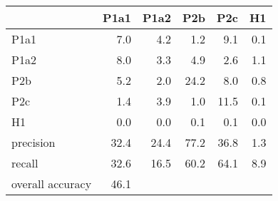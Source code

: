 \begin{tabular}{lrrrrr}
\toprule
{} &  P1a1 &  P1a2 &  P2b &  P2c &  H1 \\
\midrule
P1a1             &   7.0 &   4.2 &  1.2 &  9.1 & 0.1 \\
P1a2             &   8.0 &   3.3 &  4.9 &  2.6 & 1.1 \\
P2b              &   5.2 &   2.0 & 24.2 &  8.0 & 0.8 \\
P2c              &   1.4 &   3.9 &  1.0 & 11.5 & 0.1 \\
H1               &   0.0 &   0.0 &  0.1 &  0.1 & 0.0 \\
precision        &  32.4 &  24.4 & 77.2 & 36.8 & 1.3 \\
recall           &  32.6 &  16.5 & 60.2 & 64.1 & 8.9 \\
overall accuracy &  46.1 &       &      &      &     \\
\bottomrule
\end{tabular}
